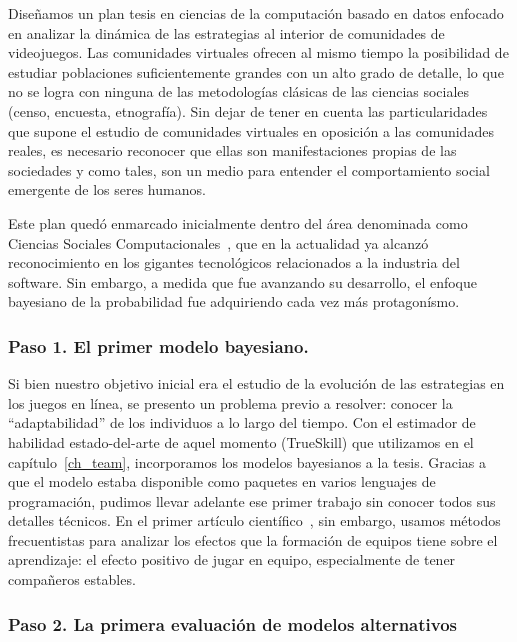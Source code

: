 \documentclass[a4paper,11pt]{book}
\theoremstyle{definition}
\begin{document}

Dise\~namos un plan tesis en ciencias de la computaci\'on basado en datos enfocado en analizar la din\'amica de las estrategias al interior de comunidades de videojuegos.
%
Las comunidades virtuales ofrecen al mismo tiempo la posibilidad de estudiar poblaciones suficientemente grandes con un alto grado de detalle, lo que no se logra con ninguna de las metodolog\'ias cl\'asicas de las ciencias sociales (censo, encuesta, etnograf\'ia).
%
Sin dejar de tener en cuenta las particularidades que supone el estudio de comunidades virtuales en oposici\'on a las comunidades reales, es necesario reconocer que ellas son manifestaciones propias de las sociedades y como tales, son un medio para entender el comportamiento social emergente de los seres humanos.


Este plan qued\'o enmarcado inicialmente dentro del \'area denominada como Ciencias Sociales Computacionales~\cite{Lazer2009, Lazer2020}, que en la actualidad ya alcanz\'o reconocimiento en los gigantes tecnol\'ogicos relacionados a la industria del software.
%
Sin embargo, a medida que fue avanzando su desarrollo, el enfoque bayesiano de la probabilidad fue adquiriendo cada vez m\'as protagon\'ismo.


\subsubsection{Paso 1. El primer modelo bayesiano.}

Si bien nuestro objetivo inicial era el estudio de la evoluci\'on de las estrategias en los juegos en l\'inea, se presento un problema previo a resolver: conocer la ``adaptabilidad'' de los individuos a lo largo del tiempo.
%
Con el estimador de habilidad estado-del-arte de aquel momento (TrueSkill) que utilizamos en el cap\'itulo~\ref{ch_team}, incorporamos los modelos bayesianos a la tesis.
%
Gracias a que el modelo estaba disponible como paquetes en varios lenguajes de programaci\'on, pudimos llevar adelante ese primer trabajo sin conocer todos sus detalles t\'ecnicos.
%
En el primer art\'iculo cient\'ifico~\cite{Landfried2019}, sin embargo, usamos m\'etodos frecuentistas para analizar los efectos que la formaci\'on de equipos tiene sobre el aprendizaje: el efecto positivo de jugar en equipo, especialmente de tener compa\~neros estables.

\subsubsection{Paso 2. La primera evaluaci\'on de modelos alternativos}
\end{document}
